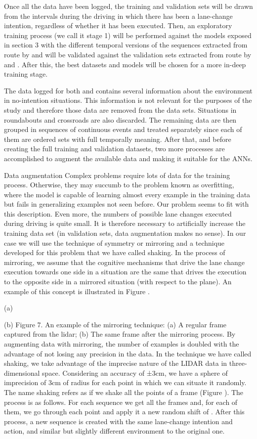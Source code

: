 Once all the data have been logged, the training and validation sets will be drawn from the intervals during the driving in which there has been a lane-change intention, regardless of whether it has been executed. Then, an exploratory training process (we call it stage 1) will be performed against the models exposed in section 3 with the different temporal versions of the sequences extracted from route  by  and will be validated against the validation sets extracted from route  by  and . After this, the best datasets and models will be chosen for a more in-deep training stage.


The data logged for both  and  contains several information about the environment in no-intention situations. This information is not relevant for the purposes of the study and therefore those data are removed from the data sets. Situations in roundabouts and crossroads are also discarded. The remaining data are then grouped in sequences of continuous events and treated separately since each of them are ordered sets with full temporally meaning.
After that, and before creating the full training and validation datasets, two more processes are accomplished to augment the available data and making it suitable for the ANNs.


Data augmentation
Complex problems require lots of data for the training process. Otherwise, they may succumb to the problem known as overfitting, where the model is capable of learning almost every example in the training data but fails in generalizing examples not seen before.
Our problem seems to fit with this description. Even more, the numbers of possible lane changes executed during driving is quite small. It is therefore necessary to artificially increase the training data set (in validation sets, data augmentation makes no sense). In our case we will use the technique of symmetry or mirroring and a technique developed for this problem that we have called shaking.
In the process of mirroring, we assume that the cognitive mechanisms that drive the lane change execution towards one side in a situation are the same that drives the execution to the opposite side in a mirrored situation (with respect to the  plane). An example of this concept is illustrated in Figure .

(a)

(b)
Figure 7. An example of the mirroring technique: (a) A regular frame captured from the lidar; (b) The same frame after the mirroring process.
By augmenting data with mirroring, the number of examples is doubled with the advantage of not losing any precision in the data.
In the technique we have called shaking, we take advantage of the imprecise nature of the LIDAR data in three-dimensional space. Considering an accuracy of ±3cm, we have a sphere of imprecision of 3cm of radius for each point in which we can situate it randomly. The name shaking refers as if we shake all the points of a frame (Figure ).
The process is as follows. For each sequence we get all the frames and, for each of them, we go through each point and apply it a new random shift of . After this process, a new sequence is created with the same lane-change intention and action, and similar but slightly different environment to the original one.


